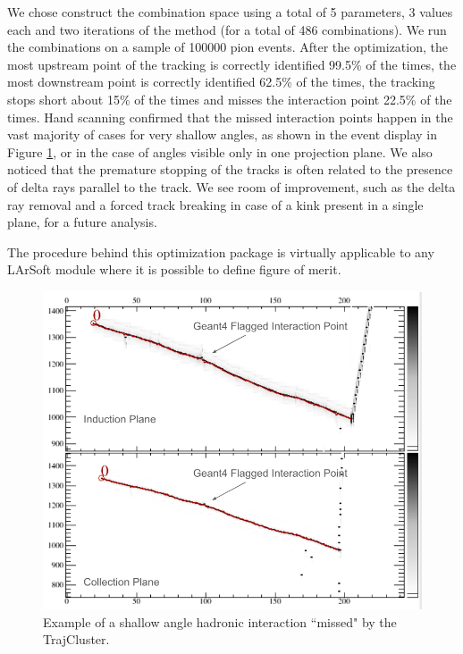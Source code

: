 We chose construct the combination space using a total of 5 parameters, 3 values each and two iterations of the method (for a total of 486 combinations). We run the combinations on a sample of 100000 pion events. 
After the optimization, the most upstream point of the tracking is correctly identified 99.5\% of the times, the most downstream point is correctly identified 62.5\% of the times, the tracking stops short about 15\% of the times and misses the interaction point 22.5\% of the times. Hand scanning confirmed that the missed interaction points happen in the vast majority of cases for very shallow angles, as shown in the event display in Figure \ref{evd:kink}, or in the case of angles visible only in one projection plane. We also noticed that the premature stopping of the tracks is often related to the presence of delta rays parallel to the track. We see room of improvement, such as the delta ray removal and a forced track breaking in case of a kink present in a single plane, for a future analysis. 

The procedure behind this optimization package is virtually applicable to any LArSoft module where it is possible to define figure of merit.


\begin{figure}[hpbt]
\centering
\includegraphics[width=15cm]{AppendixB-TrackingStudies/Kink.png}
\caption{Example of a shallow angle hadronic interaction ``missed" by the TrajCluster.}
\label{evd:kink}
\end{figure}

